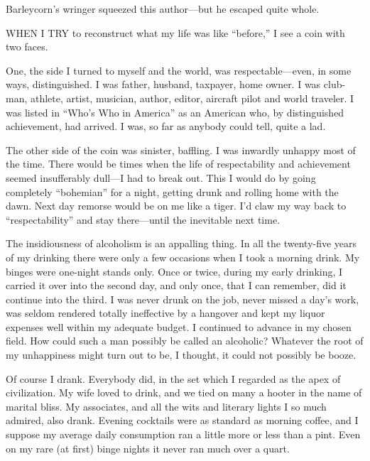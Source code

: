 
\bbChapterPreamble


\begin{biblechapter}
    Barleycorn’s wringer squeezed this author—but 
    he escaped quite whole.
\end{biblechapter}


\begin{biblechapter}
    WHEN I TRY to reconstruct what my life was like “before,” 
    I see a coin with two faces.

\verse One, the side I turned to myself and the world, 
    was respectable—even, in some ways, 
    distinguished.
\verse I was father, husband, taxpayer, home owner.
\verse I was club-man, athlete, artist, musician, 
    author, editor, aircraft pilot and world traveler.
\verse I was listed in “Who’s Who in America” as an American who, 
    by distinguished achievement, had arrived.
\verse I was, so far as anybody could tell, quite a lad.

\verse The other side of the coin was sinister, baffling. I was inwardly unhappy most of the time. There would be times when the life of respectability and achievement seemed insufferably dull—I had to break out. This I would do by going completely “bohemian” for a night, getting drunk and rolling home with the dawn. Next day remorse would be on me like a tiger. I’d claw my way back to “respectability” and stay there—until the inevitable next time.

The insidiousness of alcoholism is an appalling thing. In all the twenty-five years of my drinking there were only a few occasions when I took a morning drink. My binges were one-night stands only. Once or twice, during my early drinking, I carried it over into the second day, and only once, that I can remember, did it continue into the third. I was never drunk on the job, never missed a day’s work, was seldom rendered totally ineffective by a hangover and kept my liquor expenses well within my adequate budget. I continued to advance in my chosen field. How could such a man possibly be called an alcoholic? Whatever the root of my unhappiness might turn out to be, I thought, it could not possibly be booze.

Of course I drank. Everybody did, in the set which I regarded as the apex of civilization. My wife loved to drink, and we tied on many a hooter in the name of marital bliss. My associates, and all the wits and literary lights I so much admired, also drank. Evening cocktails were as standard as morning coffee, and I suppose my average daily consumption ran a little more or less than a pint. Even on my rare (at first) binge nights it never ran much over a quart.


\end{biblechapter}
